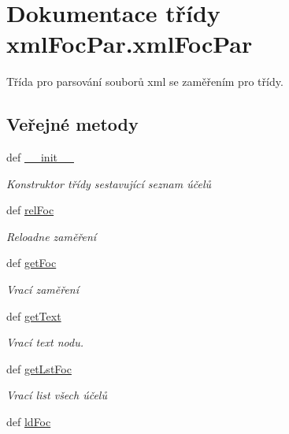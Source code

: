 \hypertarget{classxmlFocPar_1_1xmlFocPar}{\section{Dokumentace třídy xml\-Foc\-Par.\-xml\-Foc\-Par}
\label{db/ddc/classxmlFocPar_1_1xmlFocPar}
}


Třída pro parsování souborů xml se zaměřením pro třídy.  


\subsection*{Veřejné metody}
\begin{DoxyCompactItemize}
\item 
def \hyperlink{classxmlFocPar_1_1xmlFocPar_a44d2dbbd69c3c2adfa19bde523b0a9e3}{\-\_\-\-\_\-init\-\_\-\-\_\-}
\begin{DoxyCompactList}\small\item\em Konstruktor třídy sestavující seznam účelů \end{DoxyCompactList}\item 
def \hyperlink{classxmlFocPar_1_1xmlFocPar_aaea44a50c67738e5e73c3309bd258e5c}{rel\-Foc}
\begin{DoxyCompactList}\small\item\em Reloadne zaměření \end{DoxyCompactList}\item 
def \hyperlink{classxmlFocPar_1_1xmlFocPar_ab6b462d315cd7dcc9642204df9909f9b}{get\-Foc}
\begin{DoxyCompactList}\small\item\em Vrací zaměření \end{DoxyCompactList}\item 
def \hyperlink{classxmlFocPar_1_1xmlFocPar_aef5bda118fe845d2b412cd2f24df368e}{get\-Text}
\begin{DoxyCompactList}\small\item\em Vrací text nodu. \end{DoxyCompactList}\item 
def \hyperlink{classxmlFocPar_1_1xmlFocPar_af85f4653ee403814f6c6e791e632e7ad}{get\-Lst\-Foc}
\begin{DoxyCompactList}\small\item\em Vrací list všech účelů \end{DoxyCompactList}\item 
def \hyperlink{classxmlFocPar_1_1xmlFocPar_a8f63b34d54b2bdabe200d78c4bcf5bf5}{ld\-Foc}

\end{DoxyCompactItemize}
